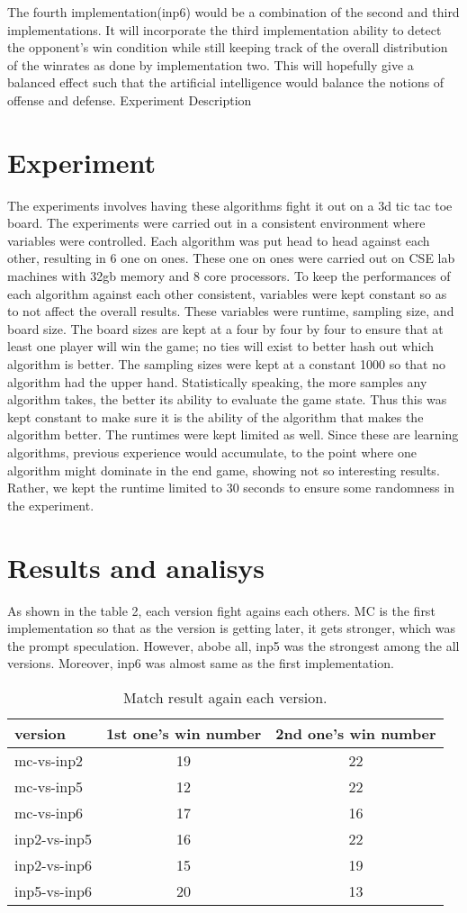 \documentclass[12pt]{article}
\begin{document}
The fourth implementation(inp6) would be a combination of the second and third implementations. It will incorporate the third implementation ability to detect the opponent’s win condition while still keeping track of the overall distribution of the winrates as done by implementation two. This will hopefully give a balanced effect such that the artificial intelligence would balance the notions of offense and defense.
Experiment Description
\section{Experiment}
The experiments involves having these algorithms fight it out on a 3d tic tac toe board. The experiments were carried out in a consistent environment where variables were controlled. Each algorithm was put head to head against each other, resulting in 6 one on ones. These one on ones were carried out on CSE lab machines with 32gb memory and 8 core processors. To keep the performances of each algorithm against each other consistent, variables were kept constant so as to not affect the overall results. These variables were runtime, sampling size, and board size. The board sizes are kept at a four by four by four to ensure that at least one player will win the game; no ties will exist to better hash out which algorithm is better. The sampling sizes were kept at a constant 1000 so that no algorithm had the upper hand. Statistically speaking, the more samples any algorithm takes, the better its ability to evaluate the game state. Thus this was kept constant to make sure it is the ability of the algorithm that makes the algorithm better. The runtimes were kept limited as well. Since these are learning algorithms, previous experience would accumulate, to the point where one algorithm might dominate in the end game, showing not so interesting results. Rather, we kept the runtime limited to 30 seconds to ensure some randomness in the experiment. 
\section{Results and analisys}
As shown in the table 2, each version fight agains each others. MC is the first implementation so that as the version is getting later, it gets stronger, which was the prompt speculation. However, abobe all, inp5 was the strongest among the all versions. Moreover, inp6 was almost same as the first implementation. 
\begin{table}
\centering
\caption{Match result again each version.}
\begin{tabular}{| l || c | c |}
\hline
version& 1st one's win number & 2nd one's win number\\
\hline
mc-vs-inp2 & 19 &22 \\
mc-vs-inp5 & 12 &22\\
mc-vs-inp6 & 17 &16\\
inp2-vs-inp5 & 16 &22\\
inp2-vs-inp6 & 15 &19\\
inp5-vs-inp6 & 20 &13\\
\hline
   \end{tabular}

\end{table}
\end{document}

